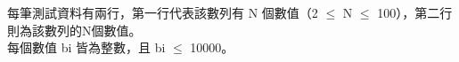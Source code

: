 每筆測試資料有兩行，第一行代表該數列有 N 個數值（2 $\leq$ N $\leq$ 100），第二行則為該數列的N個數值。\\
每個數值 bi 皆為整數，且 bi $\leq$ 10000。\\
